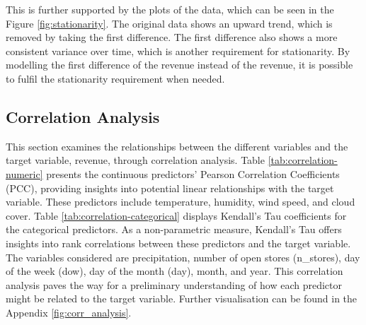 This is further supported by the plots of the data, which can be seen in the
Figure \ref{fig:stationarity}. The original data shows an upward trend, which
is removed by taking the first difference. The first difference also shows a
more consistent variance over time, which is another requirement for
stationarity.
By modelling the first difference of the revenue instead of the revenue, it is
possible to fulfil the stationarity requirement when needed.

\subsection{Correlation Analysis}

This section examines the relationships between the different variables and the
target variable, revenue, through correlation analysis. Table
\ref{tab:correlation-numeric} presents the continuous predictors' Pearson Correlation Coefficients
(PCC), providing insights into potential linear relationships with the target
variable. These predictors include temperature, humidity, wind speed, and cloud
cover. Table \ref{tab:correlation-categorical} displays Kendall's Tau
coefficients for the categorical predictors. As a non-parametric measure,
Kendall's Tau offers insights into rank correlations between these predictors
and the target variable. The variables considered are precipitation, number of
open stores (n\_stores), day of the week (dow), day of the month (day), month,
and year. This correlation analysis paves the way for a preliminary
understanding of how each predictor might be related to the target variable.
Further visualisation can be found in the Appendix \ref{fig:corr_analysis}.
